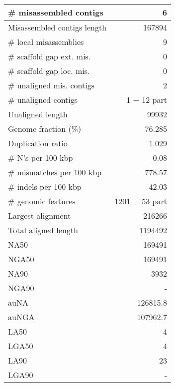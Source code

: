 \documentclass[12pt,a4paper]{article}
\begin{document}
\begin{table}[ht]
\begin{center}
\begin{tabular}{|l*{1}{|r}|}
\# misassembled contigs & 6 \\ \hline
Misassembled contigs length & 167894 \\ \hline
\# local misassemblies & 9 \\ \hline
\# scaffold gap ext. mis. & 0 \\ \hline
\# scaffold gap loc. mis. & 0 \\ \hline
\# unaligned mis. contigs & 2 \\ \hline
\# unaligned contigs & 1 + 12 part \\ \hline
Unaligned length & 99932 \\ \hline
Genome fraction (\%) & 76.285 \\ \hline
Duplication ratio & 1.029 \\ \hline
\# N's per 100 kbp & 0.08 \\ \hline
\# mismatches per 100 kbp & 778.57 \\ \hline
\# indels per 100 kbp & 42.03 \\ \hline
\# genomic features & 1201 + 53 part \\ \hline
Largest alignment & 216266 \\ \hline
Total aligned length & 1194492 \\ \hline
NA50 & 169491 \\ \hline
NGA50 & 169491 \\ \hline
NA90 & 3932 \\ \hline
NGA90 & - \\ \hline
auNA & 126815.8 \\ \hline
auNGA & 107962.7 \\ \hline
LA50 & 4 \\ \hline
LGA50 & 4 \\ \hline
LA90 & 23 \\ \hline
LGA90 & - \\ \hline
\end{tabular}
\end{center}
\end{table}
\end{document}
